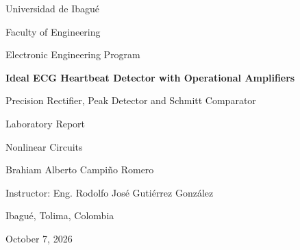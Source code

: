 \documentclass[11pt,letterpaper]{article}
\newcommand{\Vr}{V_r}
\newcommand{\Venv}{V_{env}}
\newcommand{\VTH}{V_{TH}}
\newcommand{\VTL}{V_{TL}}
\begin{document}
\begin{titlepage}
\centering
{\large Universidad de Ibagué\par}
{\large Faculty of Engineering\par}
{\large Electronic Engineering Program\par}
\vspace{2.5cm}
{\LARGE\bfseries Ideal ECG Heartbeat Detector with Operational Amplifiers\par}
\vspace{0.6cm}
{\Large Precision Rectifier, Peak Detector and Schmitt Comparator\par}
\vspace{2.5cm}
{\large Laboratory Report\par}
{\large Nonlinear Circuits\par}
\vspace{2.5cm}
{\large Brahiam Alberto Campiño Romero\par}
\vspace{0.4cm}
{\large Instructor: Eng. Rodolfo José Gutiérrez González\par}
\vfill
{\large Ibagué, Tolima, Colombia\par}
{\large October 7, 2026\par}
\end{titlepage}

\begin{abstract}
A heartbeat detector that delivers one clean rectangular pulse for every QRS complex of an ECG-like signal was designed, simulated and built. The circuit uses six operational amplifiers powered from $\pm\SI{12}{V}$ and consists of five stages: a non-inverting amplifier with a gain of 4.9, a full-wave precision rectifier, a buffered peak detector with a discharge time constant $\tau=\SI{100}{ms}$, a Schmitt comparator with thresholds $\VTH=\SI{1.01}{V}$ and $\VTL=\SI{0.52}{V}$, and an LED indicator. Each stage was sized from the signal specifications (amplitude of 0.5 to \SI{2}{V_{pp}}, width of \SI{75}{ms}, rate of 40 to 150 beats per minute) and verified with a behavioral simulation in Python and with Proteus. In simulation the circuit detected every beat within the design range for both polarities; the only failing case, 180 bpm at \SI{2}{V_{pp}}, matches the theoretical limit of \SI{163}{bpm} predicted by the discharge analysis. The breadboard build with two LM324N chips was tested with the cardiac waveform of the Agilent 33120A generator at \SI{1.2}{Hz}: it delivered one pulse per beat (\SI{1.199}{Hz} measured at the output), with peaks of \SI{4.23}{V} at $\Vr$ and \SI{4.32}{V} at $\Venv$, and it still detected every beat with a \SI{4}{V_{pp}} input, twice the design maximum.

\medskip
\noindent\textbf{Keywords:} precision rectifier, peak detector, Schmitt comparator, hysteresis, ECG, operational amplifier.
\end{abstract}
\end{document}
